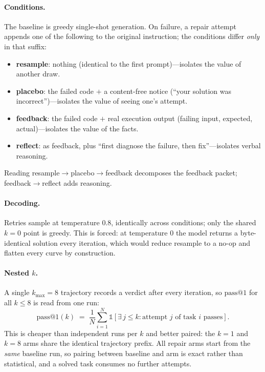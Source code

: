 \documentclass{article}
\makeatletter
\newcommand{\pass}{\mathrm{pass}@1}
\makeatother
\begin{document}
\paragraph{Conditions.}
The baseline is greedy single-shot generation. On failure, a repair attempt
appends one of the following to the original instruction; the conditions differ
\emph{only} in that suffix:
\begin{itemize}
  \item \textbf{resample}: nothing (identical to the first prompt)---isolates
  the value of another draw.
  \item \textbf{placebo}: the failed code $+$ a content-free notice
  (``your solution was incorrect'')---isolates the value of seeing one's
  attempt.
  \item \textbf{feedback}: the failed code $+$ real execution output (failing
  input, expected, actual)---isolates the value of the facts.
  \item \textbf{reflect}: as feedback, plus ``first diagnose the failure, then
  fix''---isolates verbal reasoning.
\end{itemize}
Reading \textsf{resample}$\to$\textsf{placebo}$\to$\textsf{feedback}
decomposes the feedback packet; \textsf{feedback}$\to$\textsf{reflect} adds
reasoning.

\paragraph{Decoding.}
Retries sample at temperature $0.8$, identically across conditions; only the
shared $k{=}0$ point is greedy. This is forced: at temperature $0$ the model
returns a byte-identical solution every iteration, which would reduce
\textsf{resample} to a no-op and flatten every curve by construction.

\paragraph{Nested $k$.}
A single $k_{\max}{=}8$ trajectory records a verdict after every iteration, so
$\pass$ for all $k\le 8$ is read from one run:
\[
\pass(k) \;=\; \frac{1}{N}\sum_{i=1}^{N}
  \mathbb{1}\!\left[\exists\, j \le k : \text{attempt } j \text{ of task } i
  \text{ passes}\right].
\]
This is cheaper than independent runs per $k$ and better paired: the $k{=}1$
and $k{=}8$ arms share the identical trajectory prefix. All repair arms start
from the \emph{same} baseline run, so pairing between baseline and arm is exact
rather than statistical, and a solved task consumes no further attempts.
\end{document}
